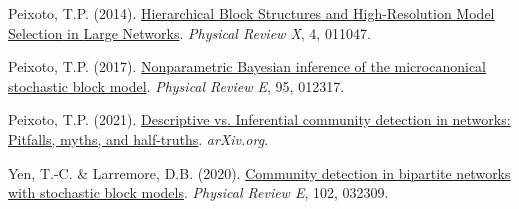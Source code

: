 \documentclass[
]{article}
\newlength{\cslhangindent}
\newlength{\cslentryspacingunit} %
\newenvironment{CSLReferences}[2] %
 {%
  \setlength{\parindent}{0pt}
  \ifodd #1
  \let\oldpar\par
  \def\par{\hangindent=\cslhangindent\oldpar}
  \fi
  \setlength{\parskip}{#2\cslentryspacingunit}
 }%
 {}
\begin{document}
\begin{CSLReferences}{1}{0}
\leavevmode{}%
Peixoto, T.P. (2014).
\href{https://doi.org/10.1103/PhysRevX.4.011047}{Hierarchical {Block
Structures} and {High-Resolution Model Selection} in {Large Networks}}.
\emph{Physical Review X}, 4, 011047.

\leavevmode{}%
Peixoto, T.P. (2017).
\href{https://doi.org/10.1103/PhysRevE.95.012317}{Nonparametric
{Bayesian} inference of the microcanonical stochastic block model}.
\emph{Physical Review E}, 95, 012317.

\leavevmode{}%
Peixoto, T.P. (2021).
\href{https://doi.org/10.1017/9781009118897}{Descriptive vs. Inferential
community detection in networks: Pitfalls, myths, and half-truths}.
\emph{arXiv.org}.

\leavevmode{}%
Yen, T.-C. \& Larremore, D.B. (2020).
\href{https://doi.org/10.1103/PhysRevE.102.032309}{Community detection
in bipartite networks with stochastic block models}. \emph{Physical
Review E}, 102, 032309.

\end{CSLReferences}
\end{document}
